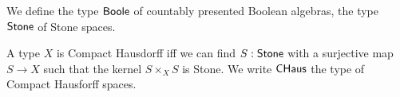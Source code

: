 We define the type $\mathsf{Boole}$ of countably presented Boolean algebras, the type $\mathsf{Stone}$ of Stone spaces.

A type $X$ is Compact Hausdorff iff we can find $S:\mathsf{Stone}$ with a surjective map $S\rightarrow X$
such that the kernel $S\times_X S$ is Stone. We write $\mathsf{CHaus}$ the type of Compact Hausforff spaces.

